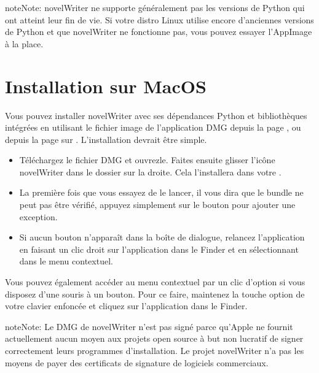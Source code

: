 \documentclass[a4paper,11pt,french]{sphinxmanual}
\begin{document}
\begin{sphinxadmonition}{note}{Note:}
\sphinxAtStartPar
novelWriter ne supporte généralement pas les versions de Python qui ont atteint leur fin de vie. Si votre distro Linux utilise encore d’anciennes versions de Python et que novelWriter ne fonctionne pas, vous pouvez essayer l’AppImage à la place.
\end{sphinxadmonition}


\section{Installation sur MacOS}
\label{\detokenize{int_started:installing-on-macos}}\label{\detokenize{int_started:a-started-macos}}
\sphinxAtStartPar
Vous pouvez installer novelWriter avec ses dépendances Python et bibliothèques intégrées en utilisant le fichier image de l’application DMG depuis la page , ou depuis la page  sur . L’installation devrait être simple.
\begin{itemize}
\item {} 
\sphinxAtStartPar
Téléchargez le fichier DMG et ouvrez\sphinxhyphen{}le. Faites ensuite glisser l’icône novelWriter dans le dossier  sur la droite. Cela l’installera dans votre .

\item {} 
\sphinxAtStartPar
La première fois que vous essayez de le lancer, il vous dira que le bundle ne peut pas être vérifié, appuyez simplement sur le bouton  pour ajouter une exception.

\item {} 
\sphinxAtStartPar
Si aucun bouton  n’apparaît dans la boîte de dialogue, relancez l’application en faisant un clic droit sur l’application dans le Finder et en sélectionnant  dans le menu contextuel.

\end{itemize}

\sphinxAtStartPar
Vous pouvez également accéder au menu contextuel par un clic d’option si vous disposez d’une souris à un bouton. Pour ce faire, maintenez la touche option de votre clavier enfoncée et cliquez sur l’application dans le Finder.

\begin{sphinxadmonition}{note}{Note:}
\sphinxAtStartPar
Le DMG de novelWriter n’est pas signé parce qu’Apple ne fournit actuellement aucun moyen aux projets open source à but non lucratif de signer correctement leurs programmes d’installation. Le projet novelWriter n’a pas les moyens de payer des certificats de signature de logiciels commerciaux.
\end{sphinxadmonition}
\end{document}
